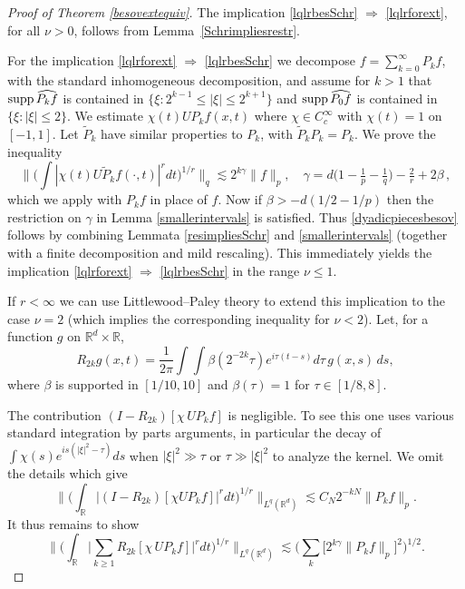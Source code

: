 \documentclass[11pt]{amsart}
\theoremstyle{definition}
\numberwithin{theorem}{section}
\numberwithin{definition}{section}
\numberwithin{equation}{section}
\newcommand{\Be}{\begin{equation}}
\newcommand{\Ee}{\end{equation}}
\renewcommand{\le}{\leqslant}
\renewcommand{\ge}{\geqslant}
\def\supp{{\text{\rm supp\,}}}
\def\lc{\lesssim}
\def\bbR{{\mathbb {R}}}
\renewcommand{\le}{\leqslant}
\renewcommand{\ge}{\geqslant}
\begin{document}
\begin{proof}[Proof of Theorem \ref{besovextequiv}]
The implication \eqref{lqlrbesSchr} $\Rightarrow$
\eqref{lqlrforext}, for all $\nu>0$, follows from
Lemma~\ref{Schrimpliesrestr}.

For the implication \eqref{lqlrforext} $\Rightarrow$
\eqref{lqlrbesSchr} we decompose $f=\sum_{k=0}^\infty P_k f$, with
the standard inhomogeneous decomposition, and assume for $k>1$  that
$\supp \widehat{P_k f}$ is contained in $\{\xi:2^{k-1}\le |\xi|\le
2^{k+1}\}$ and $\supp \widehat {P_0 f} $ is contained in  $\{\xi:
|\xi|\le 2\}$. We  estimate
 $\chi(t)  UP_k f(x,t)$ where
 $\chi\in C^\infty_c$ with $\chi(t)=1$ on $[-1,1]$.
Let $\widetilde P_k$ have similar properties to $P_k$, with $\widetilde P_k P_k=P_k$.  We prove  the  inequality
\Be \label{dyadicpiecesbesov}
\Big\| \Big(\int |\chi(t) U\widetilde P_k f(\cdot, t)|^r dt\Big)^{1/r}\Big\|_q
\lc   2^{k\gamma}\|f\|_p, \quad
\gamma=d\big(1-\tfrac1p-\tfrac 1q\big)-\tfrac 2r+2\beta\,,
\Ee
which we apply with $P_kf$ in place of $f$.
Now if $\beta>-d(1/2-1/p)$
then the restriction on $\gamma$ in Lemma \ref{smallerintervals} is
satisfied. Thus
\eqref{dyadicpiecesbesov} follows by combining
 Lemmata \ref{resimpliesSchr} and
\ref{smallerintervals} (together with a  finite decomposition and mild
rescaling).
This immediately yields the  implication \eqref{lqlrforext} $\Rightarrow$
\eqref{lqlrbesSchr}  in the range $\nu\le 1$.

If $r<\infty$ we can use
Littlewood--Paley theory  to extend this implication to  the case $\nu= 2$
(which implies the corresponding inequality for  $\nu<2$).
Let,   for a function $g$ on $\bbR^d\times \bbR$,
$$ R_{2k}g(x,t)= \frac{1}{2\pi} \int \int\beta(2^{-2k}\tau) e^{i\tau(t-s)} d\tau\,g(x,s) \, ds,$$
where  $\beta $ is supported in $[1/10, 10]$ and  $\beta(\tau)=1$ for
$\tau\in[1/8, 8]$.


The contribution $(I-R_{2k})[\chi  \,UP_k f]$ is negligible.  To see this one
 uses various standard integration by parts arguments,  in particular
the decay of $\int \chi(s)e^{is(|\xi|^2-\tau)} ds$ when $|\xi|^2 \gg \tau$
or $\tau\gg |\xi|^2$ to analyze the kernel. We omit the details which give
$$\Big\|\Big(\int_\bbR | (I-R_{2k})[\chi U P_k f]|^r dt\Big)^{1/r}\Big\|_{L^q(\bbR^d)}\lc C_N 2^{-kN} \|P_k f\|_p.$$
It thus  remains  to show
\Be \label{LPforR}
\Big\|\Big(\int_\bbR \Big| \sum_{k\ge 1} R_{2k}[\chi \,U P_k f]\Big|^r dt\Big)^{1/r}\Big\|_{L^q(\bbR^d)}\lc  \Big(\sum_k \big[ 2^{k\gamma}\|P_k f\|_p\big]^2\Big)^{1/2}.
\Ee


\end{proof}
\end{document}
